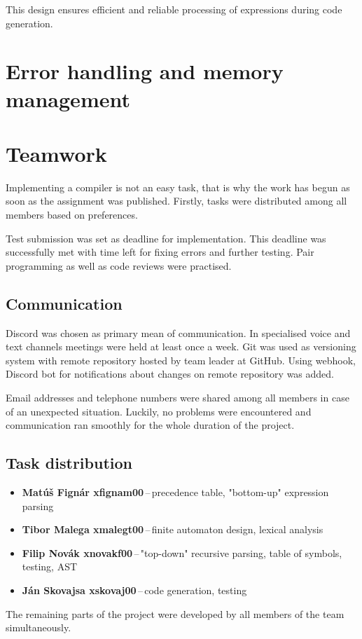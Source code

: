 \documentclass[a4paper, 11pt]{article}
\begin{document}
This design ensures efficient and reliable processing of expressions during code generation.


\section{Error handling and memory management}\label{sec:ERR}

\section{Teamwork}\label{sec:TEAM}
Implementing a compiler is not an easy task, that is why the work has begun as soon as 
the assignment was published. Firstly, tasks were distributed among all members based on 
preferences.\par 
Test submission was set as deadline for implementation. This deadline
was successfully met with time left for fixing errors and further testing. Pair programming as well as 
code reviews were practised. 

\subsection{Communication}\label{sec:COMM}
Discord was chosen as primary mean of communication. In specialised voice and text channels meetings were
held at least once a week. Git was used as versioning system with remote repository hosted by team leader at
GitHub. Using webhook, Discord bot for notifications about changes on remote repository was added.\par
Email addresses and telephone numbers were shared among all members in case of an unexpected situation.
Luckily, no problems were encountered and communication ran smoothly for the whole duration of the project.

\subsection{Task distribution}\label{sec:TASKS}
\begin{itemize}

    \item \textbf{Matúš Fignár xfignam00}\,--\,precedence table, "bottom-up" expression parsing
    \item \textbf{Tibor Malega xmalegt00}\,--\,finite automaton design, lexical analysis
    \item \textbf{Filip Novák xnovakf00}\,--\,"top-down" recursive parsing, table of symbols, testing, AST
    \item \textbf{Ján Skovajsa xskovaj00}\,--\,code generation, testing

\end{itemize}
The remaining parts of the project were developed by all members of the team simultaneously.
\end{document}
